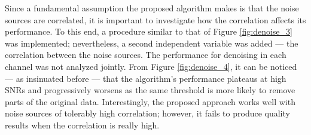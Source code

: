 \documentclass[onecolumn, groupedaddress, 10pt]{revtex4-1}
\begin{document}
Since a fundamental assumption the proposed algorithm makes is that the noise sources are correlated, it is important to investigate how the correlation affects its performance. To this end, a procedure similar to that of Figure \ref{fig:denoise_3} was implemented; nevertheless, a second independent variable was added --- the correlation between the noise sources. The performance for denoising in each channel was not analyzed jointly. From Figure \ref{fig:denoise_4}, it can be noticed --- as insinuated before --- that the algorithm's performance plateaus at high SNRs and progressively worsens as the same threshold is more likely to remove parts of the original data. Interestingly, the proposed approach works well with noise sources of tolerably high correlation; however, it fails to produce quality results when the correlation is really high.
\end{document}
